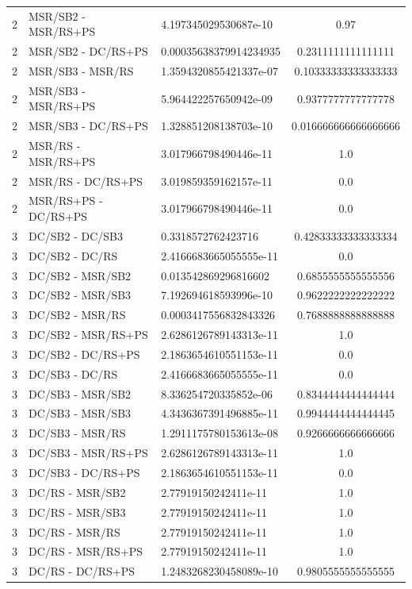 \documentclass[10pt,a4paper]{article}
\begin{document}
\begin{longtable}{c l l c}
2 & MSR/SB2 - MSR/RS+PS & 4.197345029530687e-10 & 0.97 \\
2 & MSR/SB2 - DC/RS+PS & 0.00035638379914234935 & 0.2311111111111111 \\
2 & MSR/SB3 - MSR/RS & 1.3594320855421337e-07 & 0.10333333333333333 \\
2 & MSR/SB3 - MSR/RS+PS & 5.964422257650942e-09 & 0.9377777777777778 \\
2 & MSR/SB3 - DC/RS+PS & 1.328851208138703e-10 & 0.016666666666666666 \\
2 & MSR/RS - MSR/RS+PS & 3.017966798490446e-11 & 1.0 \\
2 & MSR/RS - DC/RS+PS & 3.019859359162157e-11 & 0.0 \\
2 & MSR/RS+PS - DC/RS+PS & 3.017966798490446e-11 & 0.0 \\
\midrule
3 & DC/SB2 - DC/SB3 & 0.3318572762423716 & 0.42833333333333334 \\
3 & DC/SB2 - DC/RS & 2.4166683665055555e-11 & 0.0 \\
3 & DC/SB2 - MSR/SB2 & 0.013542869296816602 & 0.6855555555555556 \\
3 & DC/SB2 - MSR/SB3 & 7.192694618593996e-10 & 0.9622222222222222 \\
3 & DC/SB2 - MSR/RS & 0.0003417556832843326 & 0.7688888888888888 \\
3 & DC/SB2 - MSR/RS+PS & 2.6286126789143313e-11 & 1.0 \\
3 & DC/SB2 - DC/RS+PS & 2.1863654610551153e-11 & 0.0 \\
3 & DC/SB3 - DC/RS & 2.4166683665055555e-11 & 0.0 \\
3 & DC/SB3 - MSR/SB2 & 8.336254720335852e-06 & 0.8344444444444444 \\
3 & DC/SB3 - MSR/SB3 & 4.3436367391496885e-11 & 0.9944444444444445 \\
3 & DC/SB3 - MSR/RS & 1.2911175780153613e-08 & 0.9266666666666666 \\
3 & DC/SB3 - MSR/RS+PS & 2.6286126789143313e-11 & 1.0 \\
3 & DC/SB3 - DC/RS+PS & 2.1863654610551153e-11 & 0.0 \\
3 & DC/RS - MSR/SB2 & 2.77919150242411e-11 & 1.0 \\
3 & DC/RS - MSR/SB3 & 2.77919150242411e-11 & 1.0 \\
3 & DC/RS - MSR/RS & 2.77919150242411e-11 & 1.0 \\
3 & DC/RS - MSR/RS+PS & 2.77919150242411e-11 & 1.0 \\
3 & DC/RS - DC/RS+PS & 1.2483268230458089e-10 & 0.9805555555555555 \\

\end{longtable}
\end{document}
